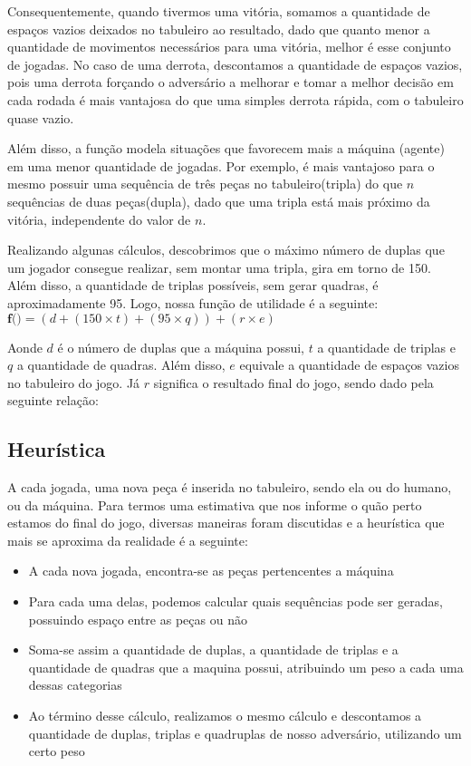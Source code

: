 \documentclass{article}
\begin{document}
      Consequentemente, quando tivermos uma vitória, somamos a quantidade de espaços vazios deixados no tabuleiro ao
      resultado, dado que quanto menor a quantidade de movimentos necessários para uma vitória, melhor é esse conjunto
      de jogadas. No caso de uma derrota, descontamos a quantidade de espaços vazios, pois uma derrota forçando o
      adversário a melhorar e tomar a melhor decisão em cada rodada é mais vantajosa do que uma simples derrota
      rápida, com o tabuleiro quase vazio.
  
      Além disso, a função modela situações que favorecem mais a máquina (agente) em uma menor quantidade de jogadas.
      Por exemplo, é mais vantajoso para o mesmo possuir uma sequência de três peças no tabuleiro(tripla) do que $n$
      sequências de duas peças(dupla), dado que uma tripla está mais próximo da vitória, independente do valor de $n$.
  
      Realizando algunas cálculos, descobrimos que o máximo número de duplas que um jogador consegue realizar, sem
      montar uma tripla, gira em torno de 150. Além disso, a quantidade de triplas possíveis, sem gerar quadras, é
      aproximadamente 95. Logo, nossa função de utilidade é a seguinte:
      \vspace{.5em}
      $\textbf{f()} = (d + (150 \times t) + (95 \times q)) + (r \times e)$
      \vspace{.5em}
  
      Aonde \textbf{$d$} é o número de duplas que a máquina possui, \textbf{$t$} a quantidade de triplas e
      \textbf{$q$} a quantidade de quadras. Além disso, \textbf{$e$} equivale a quantidade de espaços vazios no tabuleiro
      do jogo. Já \textbf{$r$} significa o resultado final do jogo, sendo dado pela seguinte relação:
  
      \vspace{.5em}
      
    \subsection {Heurística}
      A cada jogada, uma nova peça é inserida no tabuleiro, sendo ela ou do humano, ou da máquina. Para termos uma
      estimativa que nos informe o quão perto estamos do final do jogo, diversas maneiras foram discutidas e a
      heurística que mais se aproxima da realidade é a seguinte:
  
      \begin{itemize}
        \item A cada nova jogada, encontra-se as peças pertencentes a máquina
        \item Para cada uma delas, podemos calcular quais sequências pode ser geradas, possuindo espaço entre as peças
        ou não
        \item Soma-se assim a quantidade de duplas, a quantidade de triplas e a quantidade de quadras que a maquina
        possui, atribuindo um peso a cada uma dessas categorias
        \item Ao término desse cálculo, realizamos o mesmo cálculo e descontamos a quantidade de duplas, triplas e
        quadruplas de nosso adversário, utilizando um certo peso
      \end{itemize}
  
\end{document}
